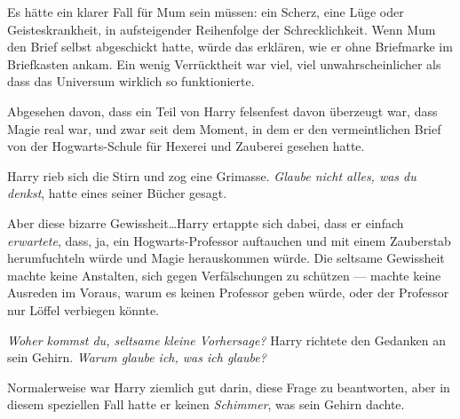 Es hätte ein klarer Fall für Mum sein müssen: ein Scherz, eine Lüge oder Geisteskrankheit, in aufsteigender Reihenfolge der Schrecklichkeit. Wenn Mum den Brief selbst abgeschickt hatte, würde das erklären, wie er ohne Briefmarke im Briefkasten ankam. Ein wenig Verrücktheit war viel, viel unwahrscheinlicher als dass das Universum wirklich so funktionierte.

Abgesehen davon, dass ein Teil von Harry felsenfest davon überzeugt war, dass Magie real war, und zwar seit dem Moment, in dem er den vermeintlichen Brief von der Hogwarts-Schule für Hexerei und Zauberei gesehen hatte.

Harry rieb sich die Stirn und zog eine Grimasse. \emph{Glaube nicht alles, was du denkst}, hatte eines seiner Bücher gesagt.

Aber diese bizarre Gewissheit…Harry ertappte sich dabei, dass er einfach \emph{erwartete}, dass, ja, ein Hogwarts-Professor auftauchen und mit einem Zauberstab herumfuchteln würde und Magie herauskommen würde. Die seltsame Gewissheit machte keine Anstalten, sich gegen Verfälschungen zu schützen — machte keine Ausreden im Voraus, warum es keinen Professor geben würde, oder der Professor nur Löffel verbiegen könnte.

\emph{Woher kommst du, seltsame kleine Vorhersage?} Harry richtete den Gedanken an sein Gehirn. \emph{Warum glaube ich, was ich glaube?}

Normalerweise war Harry ziemlich gut darin, diese Frage zu beantworten, aber in diesem speziellen Fall hatte er keinen \emph{Schimmer}, was sein Gehirn dachte.

